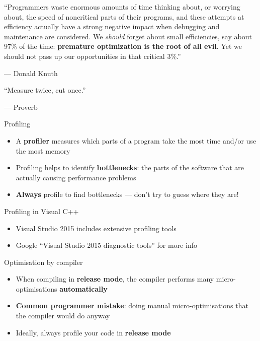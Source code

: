 \begin{frame}
	\begin{center}
		``Programmers waste enormous amounts of time thinking about, or worrying about,
		the speed of noncritical parts of their programs, and these attempts at efficiency
		actually have a strong negative impact when debugging and maintenance are considered.
		We \textit{should} forget about small efficiencies, say about 97\% of the time:
		\textbf{premature optimization is the root of all evil}.
		Yet we should not pass up our opportunities in that critical 3\%.''
	\end{center}
	\begin{flushright}
		--- Donald Knuth
	\end{flushright}
\end{frame}

\begin{frame}
	\begin{center}
		``Measure twice, cut once.''
	\end{center}
	\begin{flushright}
		--- Proverb
	\end{flushright}
\end{frame}

\begin{frame}{Profiling}
	\begin{itemize}
		\item A \textbf{profiler} measures which parts of a program take the most time
			and/or use the most memory \pause
		\item Profiling helps to identify \textbf{bottlenecks}:
			the parts of the software that are actually causing performance problems \pause
		\item \textbf{Always} profile to find bottlenecks --- don't try to guess where they are!
	\end{itemize}
\end{frame}

\begin{frame}{Profiling in Visual C++}
	\begin{itemize}
		\item Visual Studio 2015 includes extensive profiling tools \pause
		\item Google ``Visual Studio 2015 diagnostic tools'' for more info
	\end{itemize}
\end{frame}

\begin{frame}{Optimisation by compiler}
	\begin{itemize}
		\item When compiling in \textbf{release mode}, the compiler performs many
			micro-optimisations \textbf{automatically} \pause
		\item \textbf{Common programmer mistake}: doing manual micro-optimisations that the compiler would do anyway \pause
		\item Ideally, always profile your code in \textbf{release mode}
	\end{itemize}
\end{frame}
